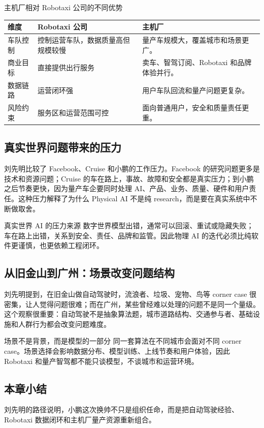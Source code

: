 \begin{knowledgebox}{主机厂相对 Robotaxi 公司的不同优势}
\begin{tabularx}{\textwidth}{p{}p{}X}
\toprule
维度 & Robotaxi 公司 & 主机厂 \\
\midrule
车队控制 & 控制运营车队，数据质量高但规模较慢 & 量产车规模大，覆盖城市和场景更广。 \\
商业目标 & 直接提供出行服务 & 卖车、智驾订阅、Robotaxi 和品牌体验并行。 \\
数据链路 & 运营闭环强 & 用户车队回流和量产问题更复杂。 \\
风险约束 & 服务区和运营范围可控 & 面向普通用户，安全和质量责任更重。 \\
\bottomrule
\end{tabularx}
\end{knowledgebox}

\subsection{真实世界问题带来的压力}

刘先明比较了 Facebook、Cruise 和小鹏的工作压力。Facebook 的研究问题更多是技术和资源问题；Cruise 的车在路上，事故、故障和安全都是真实压力；到小鹏之后节奏更快，因为量产车企要同时处理 AI、产品、业务、质量、硬件和用户责任。这种压力解释了为什么 Physical AI 不是纯 research，而是要在真实系统中不断做取舍。

\begin{warningbox}{真实世界 AI 的压力来源}
数字世界模型出错，通常可以回滚、重试或隐藏失败；车在路上出错，关系到安全、责任、品牌和监管。因此物理 AI 的迭代必须比纯软件更谨慎，也更依赖工程闭环。
\end{warningbox}

\subsection{从旧金山到广州：场景改变问题结构}

刘先明提到，在旧金山做自动驾驶时，流浪者、垃圾、宠物、鸟等 corner case 很密集，让人觉得问题很难；而在广州，某些曾经难以处理的问题不是同一个量级。这个观察很重要：自动驾驶不是抽象算法题，城市道路结构、交通参与者、基础设施和人群行为都会改变问题难度。

\begin{importantbox}{场景不是背景，而是模型的一部分}
同一套算法在不同城市会面对不同 corner case。场景选择会影响数据分布、模型训练、上线节奏和用户体验，因此 Robotaxi 和量产智驾都不能只谈模型，不谈城市和运营环境。
\end{importantbox}

\subsection{本章小结}

刘先明的路径说明，小鹏这次换帅不只是组织任命，而是把自动驾驶经验、Robotaxi 数据闭环和主机厂量产资源重新组合。

